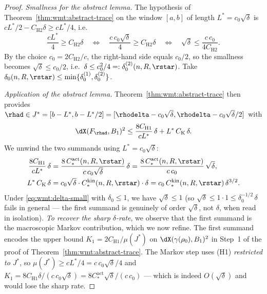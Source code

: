 \begin{proof}
\emph{Smallness for the abstract lemma.} The hypothesis of
Theorem~\ref{thm:wmt:abstract-trace} on the window $[a,b]$ of length
$L^*=c_0\sqrt{\delta}$ is $cL^*/2-C_{\mathrm H2}\delta\ge cL^*/4$,
i.e.\
\[
   \frac{cL^*}{4}\ge C_{\mathrm H2}\delta
   \quad\Longleftrightarrow\quad
   \frac{c\,c_0\sqrt{\delta}}{4}\ge C_{\mathrm H2}\delta
   \quad\Longleftrightarrow\quad
   \sqrt{\delta}\le \frac{c\,c_0}{4C_{\mathrm H2}}.
\]
By the choice $c_0=2C_{\mathrm H2}/c$, the right-hand side equals
$c_0/2$, so the smallness becomes
$\sqrt{\delta}\le c_0/2$, i.e.\ $\delta\le c_0^2/4
=:\delta_0^{(2)}(n,R,\rstar)$. Take
$\delta_0(n,R,\rstar)\le\min\{\delta_0^{(1)},\delta_0^{(2)}\}$.

\emph{Application of the abstract lemma.}
Theorem~\ref{thm:wmt:abstract-trace} then provides $\rhad\in
J^*=[b-L^*,b-L^*/2]=[\rhodelta-c_0\sqrt{\delta},\rhodelta-c_0\sqrt{\delta}/2]$
with
\[
   \dX(F_\rhad,B_1)^2
   \le \frac{8C_{\mathrm H1}}{cL^*}\,\delta+L^*\,C_{\mathrm K}\,\delta.
\]
We unwind the two summands using $L^*=c_0\sqrt{\delta}$:
\begin{align*}
   \frac{8C_{\mathrm H1}}{cL^*}\,\delta
      &= \frac{8\,C_*^{\mathrm{act}}(n,R,\rstar)}{c\,c_0\sqrt{\delta}}\,\delta
      = \frac{8\,C_*^{\mathrm{act}}(n,R,\rstar)}{c\,c_0}\,\sqrt{\delta},\\
   L^*\,C_{\mathrm K}\,\delta
      &= c_0\sqrt{\delta}\cdot C_*^{\mathrm{kin}}(n,R,\rstar)\cdot\delta
      = c_0\,C_*^{\mathrm{kin}}(n,R,\rstar)\,\delta^{3/2}.
\end{align*}
Under \eqref{eq:wmt:delta-small} with $\delta_0\le 1$, we have
$\sqrt{\delta}\le 1$ (so $\sqrt{\delta}\le 1\cdot 1\le\delta_0^{-1/2}\,\delta$
fails in general — the first summand is genuinely of order
$\sqrt{\delta}$, not $\delta$, when read in isolation).
\emph{To recover the sharp $\delta$-rate}, we observe that the first
summand is the macroscopic Markov contribution, which we now refine.
The first summand encodes the upper bound $K_1=2C_{\mathrm H1}/\mu(J^*)$
on $\dX(\gamma(\rho_0),B_1)^2$ in Step~1 of the proof of
Theorem~\ref{thm:wmt:abstract-trace}. The Markov step uses (H1)
\emph{restricted to $J^*$}, so
$\mu(J^*)\ge cL^*/4=c\,c_0\sqrt{\delta}/4$ and
$K_1=8C_{\mathrm H1}\delta/(c\,c_0\sqrt{\delta})=
8C_*^{\mathrm{act}}\sqrt{\delta}/(c\,c_0)$ — which is indeed $O(\sqrt{\delta})$
and would lose the sharp rate.


\end{proof}
